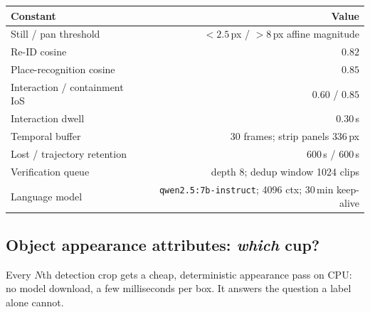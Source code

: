 \documentclass[10pt,a4paper]{article}
\newcommand{\code}[1]{\texttt{\small #1}}
\begin{document}
\begin{center}
\small
\begin{tabularx}{\linewidth}{@{}L r@{}}
\toprule
\textbf{Constant} & \textbf{Value} \\
\midrule
Still / pan threshold & \(<2.5\)\,px / \(>8\)\,px affine magnitude \\
Re-ID cosine & \(0.82\) \\
Place-recognition cosine & \(0.85\) \\
Interaction / containment IoS & \(0.60\) / \(0.85\) \\
Interaction dwell & \(0.30\)\,s \\
Temporal buffer & 30 frames; strip panels \(336\)\,px \\
Lost / trajectory retention & \(600\)\,s / \(600\)\,s \\
Verification queue & depth 8; dedup window 1024 clips \\
Language model & \code{qwen2.5:7b-instruct}; 4096 ctx; 30\,min keep-alive \\
\bottomrule
\end{tabularx}
\end{center}

\subsection{Object appearance attributes: \emph{which} cup?}

Every \(N\)th detection crop gets a cheap, deterministic appearance pass on CPU: no model download,
a few milliseconds per box. It answers the question a label alone cannot.
\end{document}
